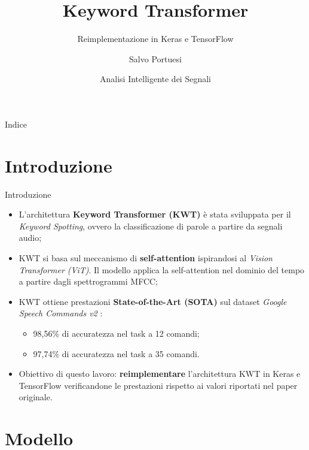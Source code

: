 \documentclass[aspectratio=169]{beamer}
\title{Keyword Transformer}
\subtitle{Reimplementazione in Keras e TensorFlow}
\author{Salvo Portuesi}
\institute{Università degli Studi di Palermo}
\date{Analisi Intelligente dei Segnali}
\begin{document}
\begin{frame}
  \titlepage
\end{frame}

\begin{frame}{Indice}
  \tableofcontents
\end{frame}

\section{Introduzione}

\begin{frame}{Introduzione}
  \begin{itemize}
    \item L'architettura \textbf{Keyword Transformer (KWT)} \cite{Berg_2021} è stata sviluppata per il \textit{Keyword Spotting}, ovvero la classificazione di parole a partire da segnali audio;
    \item KWT si basa sul meccanismo di \textbf{self-attention} ispirandosi al \textit{Vision Transformer (ViT)}. Il modello applica la self-attention nel dominio del tempo a partire dagli spettrogrammi MFCC;
    \item KWT ottiene prestazioni \textbf{State-of-the-Art (SOTA)} sul dataset \textit{Google Speech Commands v2} \cite{warden2018speechcommandsdatasetlimitedvocabulary}:
      \begin{itemize}
        \item 98,56\% di accuratezza nel task a 12 comandi;
        \item 97,74\% di accuratezza nel task a 35 comandi.
      \end{itemize}
    \item Obiettivo di questo lavoro: \textbf{reimplementare} l'architettura KWT in Keras e TensorFlow verificandone le prestazioni rispetto ai valori riportati nel paper originale.
  \end{itemize}
\end{frame}

\section{Modello}
\end{document}
